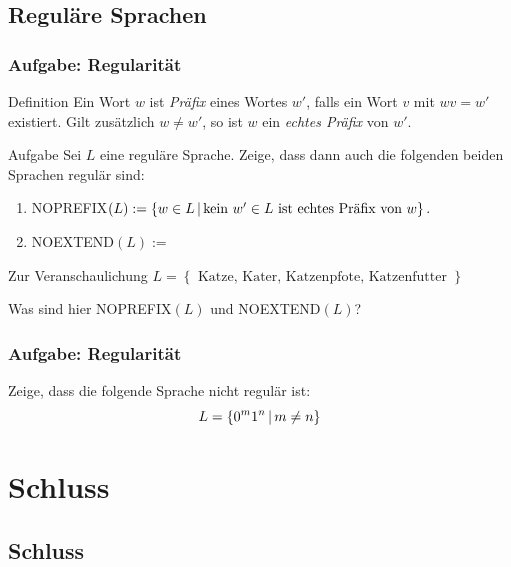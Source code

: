 \subsection{Reguläre Sprachen}

\begin{frame}
\frametitle{Aufgabe: Regularität}

\begin{block}{Definition}
Ein Wort $w$ ist \emph{Präfix} eines Wortes
$w'$, falls ein Wort $v$ mit $wv = w'$ existiert. Gilt zusätzlich $w\neq w'$, so ist $w$ ein \emph{echtes Präfix} von $w'$.
\end{block}

\pause

\begin{block}{Aufgabe}
Sei $L$ eine reguläre Sprache. Zeige, dass dann auch die folgenden beiden Sprachen regulär sind:
\begin{enumerate}
\item NOPREFIX$(L):=\left\lbrace w\in L \,\middle\vert\, \mbox{kein $w'\in L$ ist echtes Präfix
    von $w$} \right\rbrace.$
\item NOEXTEND$(L):=$ \\ 
\end{enumerate}
\end{block}

\pause

\begin{block}{Zur Veranschaulichung}
$ L = \left\lbrace \text{ Katze, Kater, Katzenpfote, Katzenfutter } \right\rbrace $

Was sind hier NOPREFIX$(L)$ und NOEXTEND$(L)$?
\end{block}

\end{frame}
\begin{frame}
 \frametitle{Aufgabe: Regularität}
 Zeige, dass die folgende Sprache nicht regulär ist:
 $$L = \left\lbrace 0^m 1^n \,\middle\vert\, m \neq n \right\rbrace$$
\end{frame}

\section{Schluss}
\subsection{Schluss}


